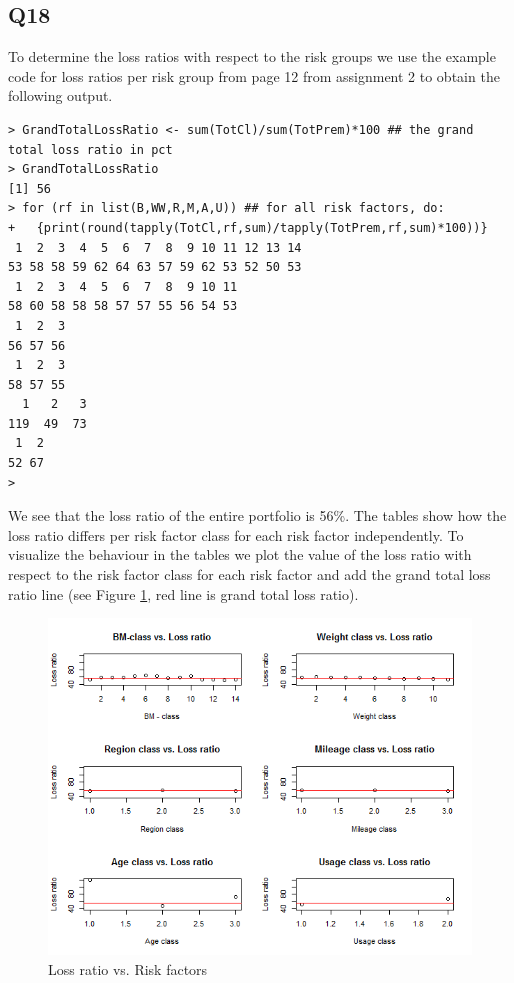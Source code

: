 \documentclass[11pt]{article}
\begin{document}
\subsection*{Q18}
To determine the loss ratios with respect to the risk groups we use the example code for loss ratios per risk group from page 12 from assignment 2 to obtain the following output.
\begin{verbatim}
> GrandTotalLossRatio <- sum(TotCl)/sum(TotPrem)*100 ## the grand total loss ratio in pct
> GrandTotalLossRatio
[1] 56
> for (rf in list(B,WW,R,M,A,U)) ## for all risk factors, do:
+   {print(round(tapply(TotCl,rf,sum)/tapply(TotPrem,rf,sum)*100))}
 1  2  3  4  5  6  7  8  9 10 11 12 13 14 
53 58 58 59 62 64 63 57 59 62 53 52 50 53 
 1  2  3  4  5  6  7  8  9 10 11 
58 60 58 58 58 57 57 55 56 54 53 
 1  2  3 
56 57 56 
 1  2  3 
58 57 55 
  1   2   3 
119  49  73 
 1  2 
52 67 
> 
\end{verbatim}
We see that the loss ratio of the entire portfolio is 56\%. The tables show how the loss ratio differs per risk factor class for each risk factor independently. To visualize the behaviour in the tables we plot the value of the loss ratio with respect to the risk factor class for each risk factor and add the grand total loss ratio line (see Figure \ref{Figure_Question18}, red line is grand total loss ratio).
\begin{center}
\begin{figure}[H]

\includegraphics[scale=1]{Q18_Risk_factors_vs_loss_ratio.png}

\caption{Loss ratio vs. Risk factors}
\label{Figure_Question18}

\end{figure}
\end{center}
\end{document}
